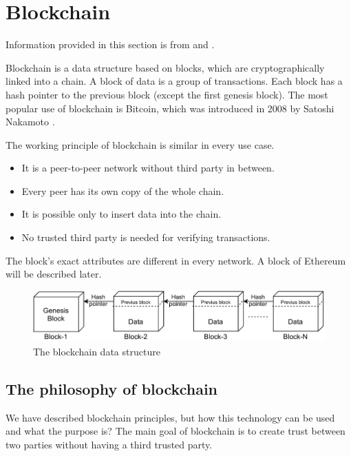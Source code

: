 \documentclass[thesis=M,english]{FITthesis}[2019/12/23]
\begin{document}
\section{Blockchain}

Information provided in this section is from \cite{Nakamoto31October2008} and \cite{Singhal2018}.

Blockchain is a data structure based on blocks, which are cryptographically linked into a chain. A block of data is a group of transactions. Each block has a hash pointer to the previous block (except the first genesis block). The most popular use of blockchain is Bitcoin, which was introduced in 2008 by Satoshi Nakamoto \cite{Nakamoto31October2008}.

The working principle of blockchain is similar in every use case. 
\begin{itemize}
\item It is a peer-to-peer network without third party in between.
\item Every peer has its own copy of the whole chain.
\item It is possible only to insert data into the chain. 
\item No trusted third party is needed for verifying transactions.
\end{itemize}
The block's exact attributes are different in every network. A block of Ethereum will be described later.

\begin{figure}[ht!]
    \centering
    \includegraphics[width=\textwidth]{assets/blockchainidea.pdf}
    \caption{The blockchain data structure \cite{Singhal2018}}
    \label{fig:blockchainidea}
\end{figure}


\subsection{The philosophy of blockchain}

We have described blockchain principles, but how this technology can be used and what the purpose is?  The main goal of blockchain is to create trust between two parties without having a third trusted party.
\end{document}
